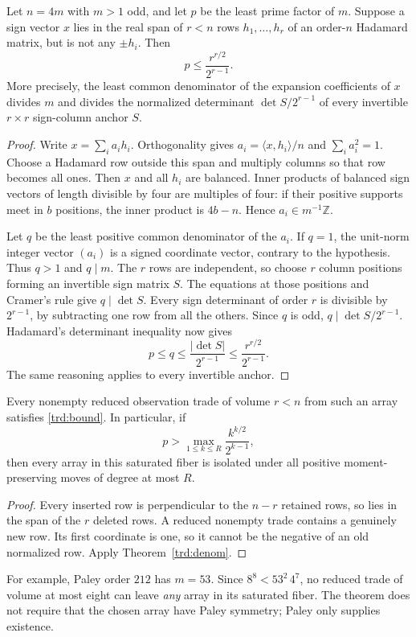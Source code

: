 \begin{theorem}\label{trd:denom}
Let $n=4m$ with $m>1$ odd, and let $p$ be the least prime factor of $m$.
Suppose a sign vector $x$ lies in the real span of $r<n$ rows
$h_1,\ldots,h_r$ of an order-$n$ Hadamard matrix, but is not any
$\pm h_i$. Then
\begin{equation}\label{trd:bound}
 p\le\frac{r^{r/2}}{2^{r-1}}.
\end{equation}
More precisely, the least common denominator of the expansion
coefficients of $x$ divides $m$ and divides the normalized determinant
$\det S/2^{r-1}$ of every invertible $r\times r$ sign-column anchor $S$.
\end{theorem}
\begin{proof}
Write $x=\sum_i a_i h_i$. Orthogonality gives
$a_i=\langle x,h_i\rangle/n$ and $\sum_i a_i^2=1$.
Choose a Hadamard row outside this span and multiply columns so that row
becomes all ones. Then $x$ and all $h_i$ are balanced. Inner products of
balanced sign vectors of length divisible by four are multiples of four:
if their positive supports meet in $b$ positions, the inner product is
$4b-n$. Hence $a_i\in m^{-1}\mathbb Z$.

Let $q$ be the least positive common denominator of the $a_i$.
If $q=1$, the unit-norm integer vector $(a_i)$ is a signed coordinate
vector, contrary to the hypothesis. Thus $q>1$ and $q\mid m$.
The $r$ rows are independent, so choose $r$ column positions forming an
invertible sign matrix $S$. The equations at those positions and Cramer's
rule give $q\mid\det S$. Every sign determinant of order $r$ is divisible
by $2^{r-1}$, by subtracting one row from all the others. Since $q$ is
odd, $q\mid\det S/2^{r-1}$. Hadamard's determinant inequality now gives
\[
 p\le q\le\frac{|\det S|}{2^{r-1}}
 \le\frac{r^{r/2}}{2^{r-1}}.
\]
The same reasoning applies to every invertible anchor.
\end{proof}

\begin{corollary}
Every nonempty reduced observation trade of volume $r<n$ from such an
array satisfies \eqref{trd:bound}. In particular, if
\[
 p>\max_{1\le k\le R}\frac{k^{k/2}}{2^{k-1}},
\]
then every array in this saturated fiber is isolated under all positive
moment-preserving moves of degree at most $R$.
\end{corollary}
\begin{proof}
Every inserted row is perpendicular to the $n-r$ retained rows, so lies
in the span of the $r$ deleted rows. A reduced nonempty trade contains
a genuinely new row. Its first coordinate is one, so it cannot be the
negative of an old normalized row. Apply Theorem~\ref{trd:denom}.
\end{proof}
For example, Paley order $212$ has $m=53$. Since
$8^8<53^2\,4^7$, no reduced trade of volume at most eight can leave
\emph{any} array in its saturated fiber. The theorem does not require
that the chosen array have Paley symmetry; Paley only supplies existence.

